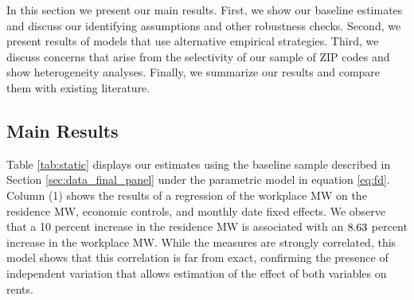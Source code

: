 
In this section we present our main results.
First, we show our baseline estimates and discuss our identifying assumptions
and other robustness checks.
Second, we present results of models that use alternative empirical strategies.
Third, we discuss concerns that arise from the selectivity of our sample of 
ZIP codes and show heterogeneity analyses. 
Finally, we summarize our results and compare them with existing literature.

\subsection{Main Results}
\label{sec:results_main}

Table \ref{tab:static} displays our estimates using the baseline sample 
described in Section \ref{sec:data_final_panel} under the parametric model
in equation \eqref{eq:fd}.
Column (1) shows the results of a regression of the workplace MW on the 
residence MW, economic controls, and monthly date fixed effects.
We observe that a 10 percent increase in the residence MW is associated with an
$8.63$ percent increase in the workplace MW.
While the measures are strongly correlated, this model shows that this 
correlation is far from exact, confirming the presence of independent variation
that allows estimation of the effect of both variables on rents.

